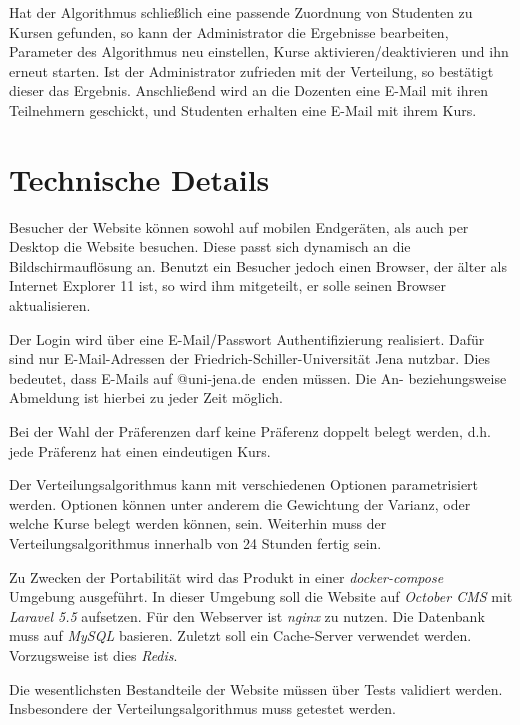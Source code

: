 		Hat der Algorithmus schließlich eine passende Zuordnung von Studenten zu Kursen gefunden, so kann der Administrator die Ergebnisse bearbeiten, Parameter des Algorithmus neu einstellen, Kurse aktivieren/deaktivieren und ihn erneut starten.
		Ist der Administrator zufrieden mit der Verteilung, so bestätigt dieser das Ergebnis.
		Anschließend wird an die Dozenten eine E-Mail mit ihren Teilnehmern geschickt, und Studenten erhalten eine E-Mail mit ihrem Kurs.
		
	\section{Technische Details}
		
		Besucher der Website können sowohl auf mobilen Endgeräten, als auch per Desktop die Website besuchen.
		Diese passt sich dynamisch an die Bildschirmauflösung an.\newline
		Benutzt ein Besucher jedoch einen Browser, der älter als Internet Explorer 11 ist, so wird ihm mitgeteilt, er solle seinen Browser aktualisieren.\newline
		
		Der Login wird über eine E-Mail/Passwort Authentifizierung realisiert.
		Dafür sind nur E-Mail-Adressen der Friedrich-Schiller-Universität Jena nutzbar.
		Dies bedeutet, dass E-Mails auf \glqq @uni-jena.de\grqq~enden müssen.
		Die An- beziehungsweise Abmeldung ist hierbei zu jeder Zeit möglich.\newline
		
		Bei der Wahl der Präferenzen darf keine Präferenz doppelt belegt werden, d.h. jede Präferenz hat einen eindeutigen Kurs. \newline
		
		Der Verteilungsalgorithmus kann mit verschiedenen Optionen parametrisiert werden. Optionen können unter anderem die Gewichtung der Varianz, oder welche Kurse belegt werden können, sein. Weiterhin muss der Verteilungsalgorithmus innerhalb von 24 Stunden fertig sein. \newline
		
		Zu Zwecken der Portabilität wird das Produkt in einer \textit{docker-compose} Umgebung ausgeführt.
		In dieser Umgebung soll die Website auf \textit{October CMS} mit \textit{Laravel 5.5} aufsetzen.
		Für den Webserver ist \textit{nginx} zu nutzen.
		Die Datenbank muss auf \textit{MySQL} basieren.
		Zuletzt soll ein Cache-Server verwendet werden.
		Vorzugsweise ist dies \textit{Redis}.\newline
		
		Die wesentlichsten Bestandteile der Website müssen über Tests validiert werden.
		Insbesondere der Verteilungsalgorithmus muss getestet werden.
		
